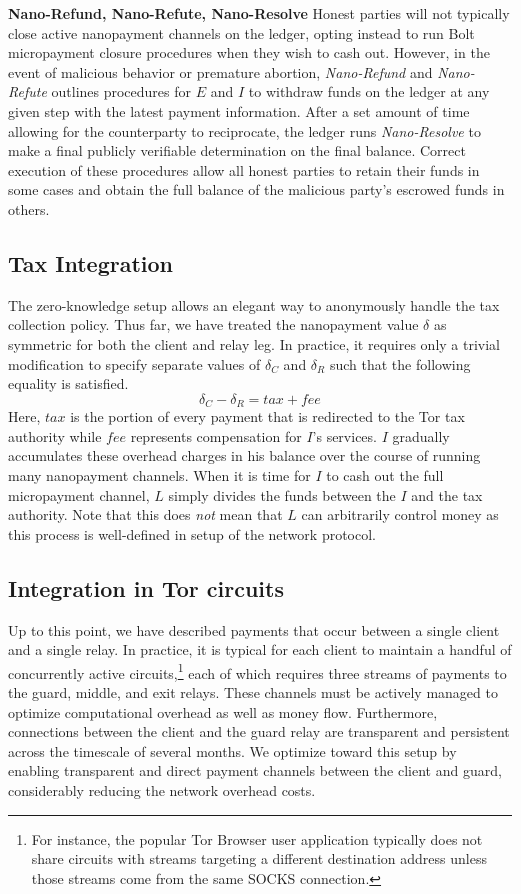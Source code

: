 \textbf{Nano-Refund, Nano-Refute, Nano-Resolve} Honest parties will not typically
close active nanopayment channels on the ledger, opting instead to run Bolt
micropayment closure procedures when they wish to cash out. However, in the
event of malicious behavior or premature abortion, \emph{Nano-Refund} and
\emph{Nano-Refute} outlines procedures for $E$ and $I$ to withdraw funds on the
ledger at any given step with the latest payment information. After a set amount
of time allowing for the counterparty to reciprocate, the ledger runs
\emph{Nano-Resolve} to make a final publicly verifiable determination on the final
balance. Correct execution of these procedures allow all honest parties to
retain their funds in some cases and obtain the full balance of the malicious
party's escrowed funds in others.

\subsection{Tax Integration}

The zero-knowledge setup allows an elegant way to anonymously handle the
tax collection policy. Thus far, we have
treated the nanopayment value $\delta$ as symmetric for both the client and
relay leg. In practice, it requires only a trivial modification to specify
separate values of $\delta_C$ and $\delta_R$ such that the following equality is
satisfied.
\begin{equation}
  \delta_C - \delta_R = tax + fee
  \label{eq:payment}
\end{equation}
Here, $tax$ is the portion of every payment that is redirected to the Tor tax
authority while $fee$ represents compensation for $I$'s services. $I$ gradually
accumulates these overhead charges in his balance over the course of running
many nanopayment channels. When it is time for $I$ to cash out the full
micropayment channel, $L$ simply divides the funds between the $I$ and the tax
authority. Note that this does \emph{not} mean that $L$ can arbitrarily control
money as this process is well-defined in setup of the network protocol.

\subsection{Integration in Tor circuits}
Up to this point, we have described payments that occur between a single client
and a single relay. In practice, it is typical for each client to maintain a
handful of concurrently active circuits,\footnote{For instance, the popular Tor
  Browser user application typically does not share circuits with streams targeting a different destination address unless those streams come from the same SOCKS connection.}  each of
which requires three streams of payments to the guard, middle, and exit
relays. These channels must be actively managed to optimize computational
overhead as well as money flow. Furthermore, connections between the client and
the guard relay are transparent and persistent across the timescale of several
months. We optimize toward this setup by enabling transparent and direct payment
channels between the client and guard, considerably reducing the network
overhead costs.
